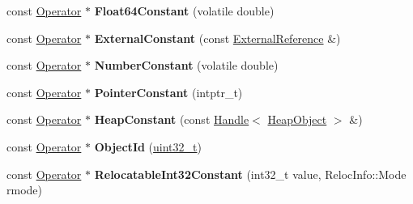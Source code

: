 \begin{DoxyCompactItemize}
const \mbox{\hyperlink{classv8_1_1internal_1_1compiler_1_1Operator}{Operator}} $\ast$ {\bfseries Float64\+Constant} (volatile double)
\item 
\mbox{\label{classv8_1_1internal_1_1compiler_1_1CommonOperatorBuilder_a54211e83561acf817e6a0794c0682c7b}} 
const \mbox{\hyperlink{classv8_1_1internal_1_1compiler_1_1Operator}{Operator}} $\ast$ {\bfseries External\+Constant} (const \mbox{\hyperlink{classv8_1_1internal_1_1ExternalReference}{External\+Reference}} \&)
\item 
\mbox{\label{classv8_1_1internal_1_1compiler_1_1CommonOperatorBuilder_aaacd2694a3a0d082521774081299762d}} 
const \mbox{\hyperlink{classv8_1_1internal_1_1compiler_1_1Operator}{Operator}} $\ast$ {\bfseries Number\+Constant} (volatile double)
\item 
\mbox{\label{classv8_1_1internal_1_1compiler_1_1CommonOperatorBuilder_a91f099b135c295abbe4ea80dc12c5dfd}} 
const \mbox{\hyperlink{classv8_1_1internal_1_1compiler_1_1Operator}{Operator}} $\ast$ {\bfseries Pointer\+Constant} (intptr\+\_\+t)
\item 
\mbox{\label{classv8_1_1internal_1_1compiler_1_1CommonOperatorBuilder_ad6360434c1e95955a98fd440173593df}} 
const \mbox{\hyperlink{classv8_1_1internal_1_1compiler_1_1Operator}{Operator}} $\ast$ {\bfseries Heap\+Constant} (const \mbox{\hyperlink{classv8_1_1internal_1_1Handle}{Handle}}$<$ \mbox{\hyperlink{classv8_1_1internal_1_1HeapObject}{Heap\+Object}} $>$ \&)
\item 
\mbox{\label{classv8_1_1internal_1_1compiler_1_1CommonOperatorBuilder_ab1d71b8f245ad414315460e6e0f39e72}} 
const \mbox{\hyperlink{classv8_1_1internal_1_1compiler_1_1Operator}{Operator}} $\ast$ {\bfseries Object\+Id} (\mbox{\hyperlink{classuint32__t}{uint32\+\_\+t}})
\item 
\mbox{\label{classv8_1_1internal_1_1compiler_1_1CommonOperatorBuilder_a6eeef8332d414b2adbbc37af58d53fab}} 
const \mbox{\hyperlink{classv8_1_1internal_1_1compiler_1_1Operator}{Operator}} $\ast$ {\bfseries Relocatable\+Int32\+Constant} (int32\+\_\+t value, Reloc\+Info\+::\+Mode rmode)

\end{DoxyCompactItemize}
